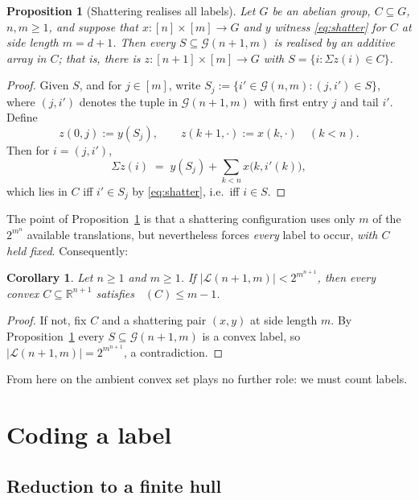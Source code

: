 \documentclass[11pt,a4paper]{article}
\theoremstyle{plain}
\newtheorem{proposition}[theorem]{Proposition}
\newtheorem{corollary}[theorem]{Corollary}
\theoremstyle{definition}
\DeclareMathOperator{\VCn}{\mathrm{VC}_n}
\newcommand{\R}{\mathbb{R}}
\newcommand{\Grid}{\mathcal{G}}
\begin{document}
\begin{proposition}[Shattering realises all labels]\label{prop:shatter}
Let $G$ be an abelian group, $C\subseteq G$, $n,m\ge1$, and suppose that
$x\colon[n]\times[m]\to G$ and $y$ witness \eqref{eq:shatter} for $C$ at side length
$m=d+1$. Then every $S\subseteq\Grid(n+1,m)$ is realised by an additive array in $C$; that
is, there is $z\colon[n+1]\times[m]\to G$ with $S=\{i:\Sigma z(i)\in C\}$.
\end{proposition}

\begin{proof}
Given $S$, and for $j\in[m]$, write $S_j:=\{i'\in\Grid(n,m) : (j,i')\in S\}$, where
$(j,i')$ denotes the tuple in $\Grid(n+1,m)$ with first entry $j$ and tail $i'$. Define
\[
  z(0,j):=y(S_j),\qquad z(k+1,\cdot):=x(k,\cdot)\quad(k<n).
\]
Then for $i=(j,i')$,
\[
  \Sigma z(i) \;=\; y(S_j)+\sum_{k<n}x\bigl(k,i'(k)\bigr),
\]
which lies in $C$ iff $i'\in S_j$ by \eqref{eq:shatter}, i.e.\ iff $i\in S$.
\end{proof}

The point of Proposition~\ref{prop:shatter} is that a shattering configuration uses only
$m$ of the $2^{m^n}$ available translations, but nevertheless forces \emph{every} label to
occur, \emph{with $C$ held fixed}. Consequently:

\begin{corollary}\label{cor:reduction}
Let $n\ge1$ and $m\ge1$. If $|\mathcal{L}(n+1,m)|<2^{m^{n+1}}$, then every convex
$C\subseteq\R^{n+1}$ satisfies $\VCn(C)\le m-1$.
\end{corollary}

\begin{proof}
If not, fix $C$ and a shattering pair $(x,y)$ at side length $m$. By
Proposition~\ref{prop:shatter} every $S\subseteq\Grid(n+1,m)$ is a convex label, so
$|\mathcal{L}(n+1,m)|=2^{m^{n+1}}$, a contradiction.
\end{proof}

From here on the ambient convex
set plays no further role: we must count labels.

\section{Coding a label}\label{sec:code}

\subsection{Reduction to a finite hull}
\end{document}
